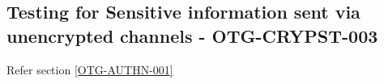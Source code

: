\subsection{Testing for Sensitive information sent via unencrypted channels - OTG-CRYPST-003}
Refer section \ref{OTG-AUTHN-001}
\clearpage